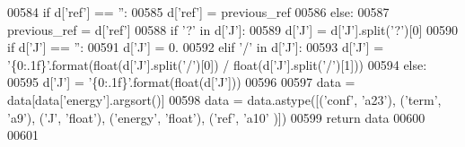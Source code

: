 \begin{DoxyCode}
00584         \textcolor{keywordflow}{if} d[\textcolor{stringliteral}{'ref'}] == \textcolor{stringliteral}{''}:
00585             d[\textcolor{stringliteral}{'ref'}] = previous\_ref
00586         \textcolor{keywordflow}{else}:
00587             previous\_ref = d[\textcolor{stringliteral}{'ref'}]
00588         \textcolor{keywordflow}{if} \textcolor{stringliteral}{'?'} \textcolor{keywordflow}{in} d[\textcolor{stringliteral}{'J'}]:
00589             d[\textcolor{stringliteral}{'J'}] = d[\textcolor{stringliteral}{'J'}].split(\textcolor{stringliteral}{'?'})[0]
00590         \textcolor{keywordflow}{if} d[\textcolor{stringliteral}{'J'}] == \textcolor{stringliteral}{''}:
00591             d[\textcolor{stringliteral}{'J'}] = 0.
00592         \textcolor{keywordflow}{elif} \textcolor{stringliteral}{'/'} \textcolor{keywordflow}{in} d[\textcolor{stringliteral}{'J'}]:
00593             d[\textcolor{stringliteral}{'J'}] = \textcolor{stringliteral}{'\{0:.1f\}'}.format(float(d[\textcolor{stringliteral}{'J'}].split(\textcolor{stringliteral}{'/'})[0]) / float(d[\textcolor{stringliteral}{'J'}].split(\textcolor{stringliteral}{'/'})[1]))
00594         \textcolor{keywordflow}{else}:
00595             d[\textcolor{stringliteral}{'J'}] = \textcolor{stringliteral}{'\{0:.1f\}'}.format(float(d[\textcolor{stringliteral}{'J'}]))
00596            
00597     data = data[data[\textcolor{stringliteral}{'energy'}].argsort()]
00598     data = data.astype([(\textcolor{stringliteral}{'conf'}, \textcolor{stringliteral}{'a23'}), (\textcolor{stringliteral}{'term'}, \textcolor{stringliteral}{'a9'}), (\textcolor{stringliteral}{'J'}, \textcolor{stringliteral}{'float'}), (\textcolor{stringliteral}{'energy'}, \textcolor{stringliteral}{'float'}), (\textcolor{stringliteral}{'ref'}, \textcolor{stringliteral}{'a10'}
      )])
00599     \textcolor{keywordflow}{return} data
00600 
00601 
\end{DoxyCode}
